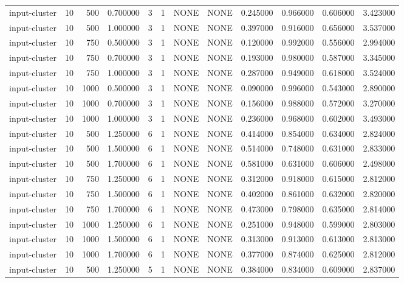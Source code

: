 \begin{tabular}{lrrrllllrrrr}
input-cluster & 10 & 500 & 0.700000 & 3 & 1 & NONE & NONE & 0.245000 & 0.966000 & 0.606000 & 3.423000 \\
input-cluster & 10 & 500 & 1.000000 & 3 & 1 & NONE & NONE & 0.397000 & 0.916000 & 0.656000 & 3.537000 \\
input-cluster & 10 & 750 & 0.500000 & 3 & 1 & NONE & NONE & 0.120000 & 0.992000 & 0.556000 & 2.994000 \\
input-cluster & 10 & 750 & 0.700000 & 3 & 1 & NONE & NONE & 0.193000 & 0.980000 & 0.587000 & 3.345000 \\
input-cluster & 10 & 750 & 1.000000 & 3 & 1 & NONE & NONE & 0.287000 & 0.949000 & 0.618000 & 3.524000 \\
input-cluster & 10 & 1000 & 0.500000 & 3 & 1 & NONE & NONE & 0.090000 & 0.996000 & 0.543000 & 2.890000 \\
input-cluster & 10 & 1000 & 0.700000 & 3 & 1 & NONE & NONE & 0.156000 & 0.988000 & 0.572000 & 3.270000 \\
input-cluster & 10 & 1000 & 1.000000 & 3 & 1 & NONE & NONE & 0.236000 & 0.968000 & 0.602000 & 3.493000 \\
input-cluster & 10 & 500 & 1.250000 & 6 & 1 & NONE & NONE & 0.414000 & 0.854000 & 0.634000 & 2.824000 \\
input-cluster & 10 & 500 & 1.500000 & 6 & 1 & NONE & NONE & 0.514000 & 0.748000 & 0.631000 & 2.833000 \\
input-cluster & 10 & 500 & 1.700000 & 6 & 1 & NONE & NONE & 0.581000 & 0.631000 & 0.606000 & 2.498000 \\
input-cluster & 10 & 750 & 1.250000 & 6 & 1 & NONE & NONE & 0.312000 & 0.918000 & 0.615000 & 2.812000 \\
input-cluster & 10 & 750 & 1.500000 & 6 & 1 & NONE & NONE & 0.402000 & 0.861000 & 0.632000 & 2.820000 \\
input-cluster & 10 & 750 & 1.700000 & 6 & 1 & NONE & NONE & 0.473000 & 0.798000 & 0.635000 & 2.814000 \\
input-cluster & 10 & 1000 & 1.250000 & 6 & 1 & NONE & NONE & 0.251000 & 0.948000 & 0.599000 & 2.803000 \\
input-cluster & 10 & 1000 & 1.500000 & 6 & 1 & NONE & NONE & 0.313000 & 0.913000 & 0.613000 & 2.813000 \\
input-cluster & 10 & 1000 & 1.700000 & 6 & 1 & NONE & NONE & 0.377000 & 0.874000 & 0.625000 & 2.812000 \\
input-cluster & 10 & 500 & 1.250000 & 5 & 1 & NONE & NONE & 0.384000 & 0.834000 & 0.609000 & 2.837000 \\

\end{tabular}
